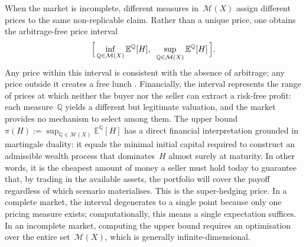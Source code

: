 When the market is incomplete, different measures in~$\mathcal{M}(X)$
assign different prices to the same non-replicable claim.  Rather than a
unique price, one obtains the arbitrage-free price interval
\begin{equation}
\label{eq:price_interval}
\Bigl[\,
  \inf_{\mathbb{Q} \in \mathcal{M}(X)} \mathbb{E}^{\mathbb{Q}}[H],
  \;\;
  \sup_{\mathbb{Q} \in \mathcal{M}(X)} \mathbb{E}^{\mathbb{Q}}[H]
\,\Bigr].
\end{equation}
Any price within this interval is consistent with the absence of
arbitrage; any price outside it creates a free lunch
\citep{DelbaenSchachermayer1994}.  Financially, the interval represents
the range of prices at which neither the buyer nor the seller can extract a
risk-free profit: each measure~$\mathbb{Q}$ yields a different but
legitimate valuation, and the market provides no mechanism to select among
them.  The upper bound
$\pi(H) := \sup_{\mathbb{Q} \in \mathcal{M}(X)}
\mathbb{E}^{\mathbb{Q}}[H]$ has a direct financial interpretation grounded
in martingale duality: it equals the minimal initial capital required to
construct an admissible wealth process that dominates~$H$ almost surely at
maturity.  In other words, it is the cheapest amount of money a seller
must hold today to guarantee that, by trading in the available assets, the
portfolio will cover the payoff regardless of which scenario materialises.
This is the super-hedging price.  In a complete market, the interval
degenerates to a single point because only one pricing measure exists;
computationally, this means a single expectation suffices.  In an
incomplete market, computing the upper bound requires an optimisation over
the entire set~$\mathcal{M}(X)$, which is generally infinite-dimensional.

